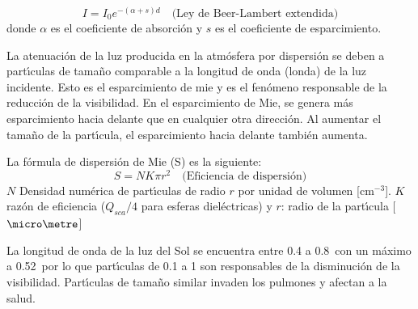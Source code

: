 \begin{equation}
I = I_0 e^{-(\alpha + s)d} \quad \text{(Ley de Beer-Lambert extendida)}
\end{equation}
donde $\alpha$ es el coeficiente de absorci\'on y $s$ es el coeficiente de esparcimiento.

La atenuaci\'on de la luz producida en la atm\'osfera por dispersi\'on se deben a part\'{\i}culas de tama\~no comparable a la longitud de onda (\gls{londa}) de la luz incidente. Esto es el esparcimiento de \gls{mie} y es el fen\'omeno responsable de la reducci\'on de la visibilidad. En el esparcimiento de Mie, se genera m\'as esparcimiento hacia delante que en cualquier otra direcci\'on. Al aumentar el tama\~no de la part\'{\i}cula, el esparcimiento hacia delante tambi\'en aumenta.


La f\'ormula de dispersi\'on de Mie (S) es la siguiente:
\begin{equation}
S = NK\pi r^2 \quad \text{(Eficiencia de dispersi\'on)}
\end{equation}
$N$ Densidad num\'erica  de part\'{\i}culas de radio $r$ por unidad de volumen [cm$^{-3}$]. $K$ raz\'on de eficiencia (${Q_{sca}}/{4}$ para esferas diel\'ectricas) y
$r$: radio de la part\'{\i}cula [$\micro\metre$]

La longitud de onda de la luz del Sol se encuentra entre 0.4 a 0.8\micro\metre\,  con un m\'aximo a 0.52\micro\metre\, por lo que part\'{\i}culas de 0.1 a 1{\micro\metre} son responsables de la disminuci\'on de la visibilidad. Part\'{\i}culas de tama\~no similar invaden los pulmones y afectan a la salud.

